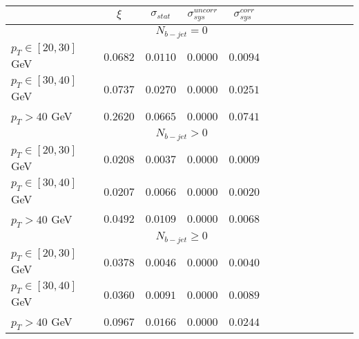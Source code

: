 \documentclass{article}
\begin{document}
\begin{table}[h]
\begin{tabular}{|l||c|c|c|c||c|c|c|c||c|c|c|c|}
\hline
 & $\xi$ & $\sigma_{stat}$ & $\sigma_{sys}^{uncorr}$ & $\sigma_{sys}^{corr}$\\ 
\hline\hline
&\multicolumn{4}{c||}{$N_{b-jet} = 0$}\\ \hline
$p_{T}\in[20,30]$ GeV &  $0.0682$ &  $0.0110$ &  $0.0000$ &  $0.0094$\\ 
$p_{T}\in[30,40]$ GeV &  $0.0737$ &  $0.0270$ &  $0.0000$ &  $0.0251$\\ 
$p_{T} > 40$ GeV &  $0.2620$ &  $0.0665$ &  $0.0000$ &  $0.0741$\\ 
\hline\hline &\multicolumn{4}{c||}{$N_{b-jet} > 0$}\\ \hline
$p_{T}\in[20,30]$ GeV &  $0.0208$ &  $0.0037$ &  $0.0000$ &  $0.0009$\\ 
$p_{T}\in[30,40]$ GeV &  $0.0207$ &  $0.0066$ &  $0.0000$ &  $0.0020$\\ 
$p_{T} > 40$ GeV &  $0.0492$ &  $0.0109$ &  $0.0000$ &  $0.0068$\\ 
\hline\hline &\multicolumn{4}{c||}{$N_{b-jet} \geq 0$}\\ \hline
$p_{T}\in[20,30]$ GeV &  $0.0378$ &  $0.0046$ &  $0.0000$ &  $0.0040$\\ 
$p_{T}\in[30,40]$ GeV &  $0.0360$ &  $0.0091$ &  $0.0000$ &  $0.0089$\\ 
$p_{T} > 40$ GeV &  $0.0967$ &  $0.0166$ &  $0.0000$ &  $0.0244$\\ 
\hline
\end{tabular}
\end{table}
\end{document}
